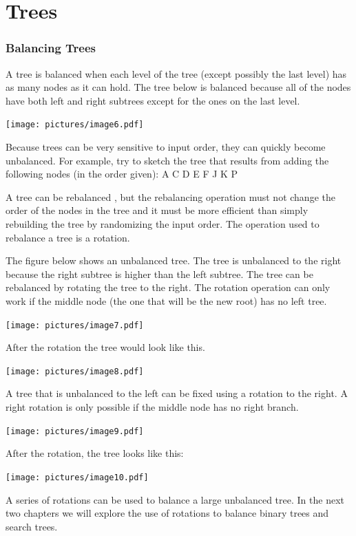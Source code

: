 \chapter{Trees} \label{tree}

\subsection{Balancing Trees}

A tree is balanced when each level of the tree (except possibly the last
level) has as many nodes as it can hold. The tree below is balanced
because all of the nodes have both left and right subtrees except for
the ones on the last level.

\texttt{[image: pictures/image6.pdf]}

Because trees can be very sensitive to input order, they can quickly
become unbalanced.  For example,  try to sketch the tree that results from adding the
following nodes (in the order given): A C D E F J K P    

A tree can be rebalanced , but the rebalancing operation must not change
the order of the nodes in the tree and it must be more efficient than
simply rebuilding the tree by randomizing the input order. The operation
used to rebalance a tree is a rotation.

The figure below shows an unbalanced tree. The tree is unbalanced to the
right because the right subtree is higher than the left subtree.  The tree can be rebalanced by rotating the tree to the right. The
rotation operation can only work if the middle node (the one that will
be the new root) has no left tree.

\texttt{[image: pictures/image7.pdf]}

After the rotation the tree would look like this.

\texttt{[image: pictures/image8.pdf]}

A tree that is unbalanced to the left can be fixed using a rotation to
the right. A right rotation is only possible if the middle node has no
right branch.

\texttt{[image: pictures/image9.pdf]}

After the rotation, the tree looks like this:

\texttt{[image: pictures/image10.pdf]}

A series of rotations can be used to balance a large unbalanced tree. In the next two chapters we will explore the use of rotations to
 balance binary trees and search trees.



